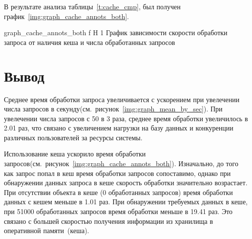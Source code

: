 В результате анализа таблицы~\ref{t:cache_cmp}, был получен график~\ref{img:graph_cache_annots_both}.

{graph_cache_annots_both} %
{f} %
{H} %
{1\textwidth} %
{График зависимости скорости обработки запроса от наличия кеша и числа обработанных запросов} %

\section*{Вывод}
Среднее время обработки запроса увеличивается с ускорением при увелечении числа запросов в секунду(см.~рисунок~\ref{img:graph_mean_by_sec}). При увелечении числа запросов с 50 в 3 раза, среднее время обработки увеличилось в 2.01 раз, что связано с увеличением нагрузки на базу данных и конкуренции различных пользователей за ресурсы системы.

Использование кеша ускорило время обработки запросов(см.~рисунок~\ref{img:graph_cache_annots_both}). Изначально, до того как запрос попал в кеш время обработки запросов сопоставимо, однако при обнаружении данных запроса в кеше скорость обработки значительно возрастает.
При отсутствии объекта в кеше (0 обработанных запросов) время обработки данных с кешем меньше в 1.01 раз. При обнаружении требуемых данных в кеше, при 51000 обработанных запросов время обработки меньше в 19.41 раз. Это связано с большей скоростью получения информации из хранилища в оперативной памяти~(кеша).





